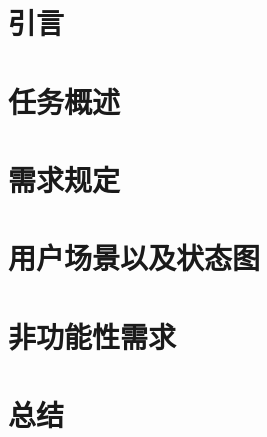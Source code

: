 \documentclass[12pt,hyperref,a4paper,UTF8]{ctexart}
\begin{document}
\cover

%
%

\thispagestyle{empty} %

\newpage
\tableofcontents

\newpage


\section{引言}

\section{任务概述}

\section{需求规定}

\section{用户场景以及状态图}

\section{非功能性需求}

\section{总结}

\end{document}
